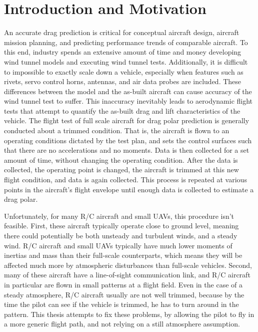 \chapter{Introduction and Motivation}
\label{intro}
An accurate drag prediction is critical for conceptual aircraft design, aircraft mission planning, and predicting performance trends of comparable aircraft. To this end, industry spends an extensive amount of time and money developing wind tunnel models and executing wind tunnel tests. Additionally, it is difficult to impossible to exactly scale down a vehicle, especially when features such as rivets, servo control horns, antennas, and air data probes are included. These differences between the model and the as-built aircraft can cause accuracy of the wind tunnel test to suffer. This inaccuracy inevitably leads to aerodynamic flight tests that attempt to quantify the as-built drag and lift characteristics of the vehicle.
\indent
The flight test of full scale aircraft for drag polar prediction is generally conducted about a trimmed condition. That is, the aircraft is flown to an operating conditions dictated by the test plan, and sets the control surfaces such that there are no accelerations and no moments. Data is then collected for a set amount of time, without changing the operating condition. After the data is collected, the operating point is changed, the aircraft is trimmed at this new flight condition, and data is again collected. This process is repeated at various points in the aircraft's flight envelope until enough data is collected to estimate a drag polar.

\indent
Unfortunately, for many R/C aircraft and small UAVs, this procedure isn't feasible. First, these aircraft typically operate close to ground level, meaning there could potentially be both unsteady and turbulent winds, and a steady wind. R/C aircraft and small UAVs typically have much lower moments of inertias and mass than their full-scale counterparts, which means they will be affected much more by atmospheric disturbances than full-scale vehicles. Second, many of these aircraft have a line-of-sight communication link, and R/C aircraft in particular are flown in small patterns at a flight field. Even in the case of a steady atmosphere, R/C aircraft usually are not well trimmed, because by the time the pilot can see if the vehicle is trimmed, he has to turn around in the pattern. This thesis attempts to fix these problems, by allowing the pilot to fly in a more generic flight path, and not relying on a still atmosphere assumption.

